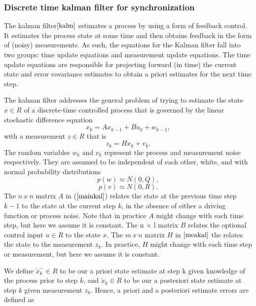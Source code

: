 \documentclass[journal]{IEEEtran}
\begin{document}
\subsubsection{\textbf{Discrete time kalman filter for synchronization}}
The kalman filter$\cite{kalm}$ estimates a process by using a form
of feedback control. It estimates the process state at some time and
then obtains feedback in the form of (noisy) measurements. As such,
the equations for the Kalman filter fall into two groups: time
update equations and measurement update equations. The time update
equations are responsible for projecting forward (in time) the
current state and error covariance estimates to obtain a priori
estimates for the next time step.
\par
The kalman filter addresses the general problem of trying to
estimate the state $x \in R$ of a discrete-time controlled process that is
governed by the linear stochastic difference equation
\begin{equation}
 x_k = Ax_{k-1} + Bu_k + w_{k-1} , \label{mainkal}
\end{equation}
with a measurement $z \in R$ that is
\begin{equation}
 z_k = Hx_k + v_k. \label{meakal}
\end{equation}
The random variables $w_k$ and $v_k$ represent the process and
measurement noise respectively. They are assumed to be
independent of each other, white, and with normal probability
distributions
\begin{equation}
 p(w) \approx N(0,Q),
\end{equation}
\begin{equation}
 p(v) \approx N(0,R).
\end{equation}
The $n\ x\ n$ matrix $A$ in ($\ref{mainkal}$) relates the state at the previous time step $k-1$ to the state at the current step $k$, in the absence of either a driving function or process noise. Note that in practice $A$ might change with each time step, but
here we assume it is constant. The n × l matrix $B$ relates the optional control input $u \in R$ to the state $x$. The $m\ x\ n$ matrix $H$ in $\ref{meakal}$ the relates the state to the measurement $z_k$. In practice, $H$ might change with each time step or
measurement, but here we assume it is constant.
\par
We define $\tilde x_k^- \in R$ to be our a priori state estimate at step k given knowledge of the process prior to step $k$, and $\tilde x_k \in R$ to be our a posteriori state estimate at step $k$ given measurement $z_k$. Hence, a priori and a posteriori estimate errors are defined as
\end{document}
